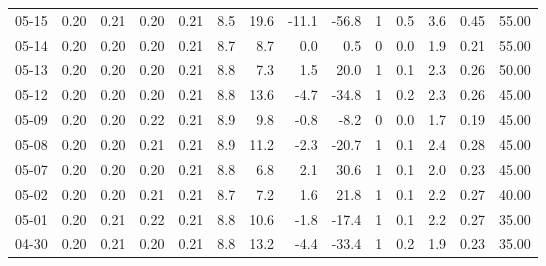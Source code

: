 \begin{threeparttable}
{\begin{tabular}{lrrrrrrrrrrrrr}
  05-15 &          0.20 &          0.21 &          0.20 &        0.21 &                 8.5 &                19.6 &      -11.1 &        -56.8 &              1 &                 0.5 &              3.6 &            0.45 &                  55.00 \\
  05-14 &          0.20 &          0.20 &          0.20 &        0.21 &                 8.7 &                 8.7 &        0.0 &          0.5 &              0 &                 0.0 &              1.9 &            0.21 &                  55.00 \\
  05-13 &          0.20 &          0.20 &          0.20 &        0.21 &                 8.8 &                 7.3 &        1.5 &         20.0 &              1 &                 0.1 &              2.3 &            0.26 &                  50.00 \\
  05-12 &          0.20 &          0.20 &          0.20 &        0.21 &                 8.8 &                13.6 &       -4.7 &        -34.8 &              1 &                 0.2 &              2.3 &            0.26 &                  45.00 \\
  05-09 &          0.20 &          0.20 &          0.22 &        0.21 &                 8.9 &                 9.8 &       -0.8 &         -8.2 &              0 &                 0.0 &              1.7 &            0.19 &                  45.00 \\
  05-08 &          0.20 &          0.20 &          0.21 &        0.21 &                 8.9 &                11.2 &       -2.3 &        -20.7 &              1 &                 0.1 &              2.4 &            0.28 &                  45.00 \\
  05-07 &          0.20 &          0.20 &          0.20 &        0.21 &                 8.8 &                 6.8 &        2.1 &         30.6 &              1 &                 0.1 &              2.0 &            0.23 &                  45.00 \\
  05-02 &          0.20 &          0.20 &          0.21 &        0.21 &                 8.7 &                 7.2 &        1.6 &         21.8 &              1 &                 0.1 &              2.2 &            0.27 &                  40.00 \\
  05-01 &          0.20 &          0.21 &          0.22 &        0.21 &                 8.8 &                10.6 &       -1.8 &        -17.4 &              1 &                 0.1 &              2.2 &            0.27 &                  35.00 \\
  04-30 &          0.20 &          0.21 &          0.20 &        0.21 &                 8.8 &                13.2 &       -4.4 &        -33.4 &              1 &                 0.2 &              1.9 &            0.23 &                  35.00 \\

\end{tabular}}
\end{threeparttable}
